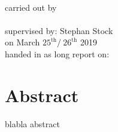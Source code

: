 \begin{center}
	\makeatletter
	\thispagestyle{empty}
	\null\vspace{15mm}
	\Huge\textbf{\@title} \\
	\vspace{14mm}
	\large carried out by \\
	\Large  \textbf{\@author} \\
	\vspace{2mm}
	\large supervised by: Stephan Stock\textbf{} \\
	\vspace{4mm}
	\large on March $25^{\text{th}} / \ 26^{\text{th}}$ 2019 \\
	\vspace{15mm}
	\large handed in as long report on: \  \@date \\ 
	\makeatother
	\vspace{20mm}
	\section*{Abstract}
\end{center}
blabla abstract

